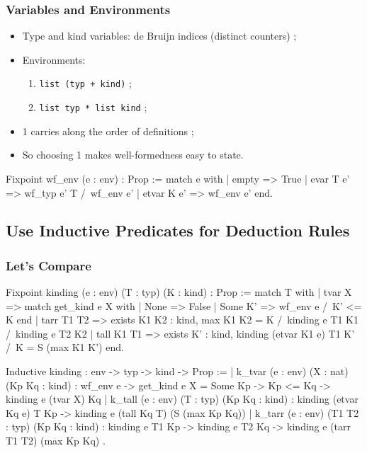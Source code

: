 \documentclass{beamer}
\begin{document}
\begin{frame}[fragile]

\frametitle{Variables and Environments}

\begin{itemize}
\item Type and kind variables: de Bruijn indices (distinct
  counters) ;
\item Environments:
  \begin{enumerate}
    \item \verb|list (typ + kind)| ;
    \item \verb|list typ * list kind| ;
  \end{enumerate}
\item 1 carries along the order of definitions ;
\item So choosing 1 makes well-formedness easy to state.
\end{itemize}

\begin{pyglist}
Fixpoint wf_env (e : env) : Prop :=
  match e with
    | empty      => True
    | evar T e'  => wf_typ e' T /\ wf_env e'
    | etvar K e' => wf_env e'
  end.
\end{pyglist}

\end{frame}

\subsection{Use Inductive Predicates for Deduction Rules}

\begin{frame}[fragile]

\frametitle{Let's Compare}

\begin{pyglist}[fontsize=\scriptsize]
Fixpoint kinding (e : env) (T : typ) (K : kind) : Prop :=
  match T with
  | tvar X => match get_kind e X with
              | None => False
              | Some K' => wf_env e /\ K' <= K
              end
  | tarr T1 T2 => exists K1 K2 : kind,
      max K1 K2 = K /\ kinding e T1 K1 /\ kinding e T2 K2
  | tall K1 T1 => exists K' : kind,
      kinding (etvar K1 e) T1 K' /\ K = S (max K1 K')
  end.
\end{pyglist}

\begin{pyglist}[fontsize=\scriptsize]
Inductive kinding : env -> typ -> kind -> Prop :=
| k_tvar (e : env) (X : nat) (Kp Kq : kind) :
  wf_env e -> get_kind e X = Some Kp -> Kp <= Kq -> kinding e (tvar X) Kq
| k_tall (e : env) (T : typ) (Kp Kq : kind) :
  kinding (etvar Kq e) T Kp -> kinding e (tall Kq T) (S (max Kp Kq))
| k_tarr (e : env) (T1 T2 : typ) (Kp Kq : kind) :
  kinding e T1 Kp -> kinding e T2 Kq -> kinding e (tarr T1 T2) (max Kp Kq)
.
\end{pyglist}

\end{frame}
\end{document}
